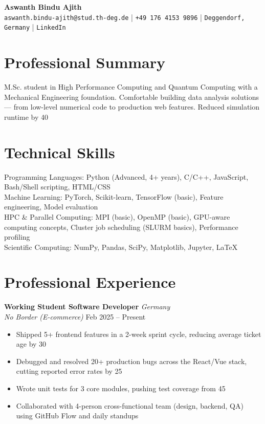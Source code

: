\documentclass[11pt,a4paper]{article}
\newcommand{\entryheader}[4]{%
    \textbf{#1} \hfill \textit{#2}\\
    \textit{#3} \hfill #4
}
\begin{document}
\begin{center}
    {\LARGE\bfseries Aswanth Bindu Ajith}\\[4pt]
    \texttt{aswanth.bindu-ajith@stud.th-deg.de} | \texttt{+49 176 4153 9896} | \texttt{Deggendorf, Germany} | \texttt{LinkedIn}
\end{center}

\section{Professional Summary}
M.Sc. student in High Performance Computing and Quantum Computing with a Mechanical Engineering foundation. Comfortable building data analysis solutions — from low-level numerical code to production web features. Reduced simulation runtime by 40%

\section{Technical Skills}

Programming Languages: Python (Advanced, 4+ years), C/C++, JavaScript, Bash/Shell scripting, HTML/CSS\\

Machine Learning: PyTorch, Scikit-learn, TensorFlow (basic), Feature engineering, Model evaluation\\

HPC & Parallel Computing: MPI (basic), OpenMP (basic), GPU-aware computing concepts, Cluster job scheduling (SLURM basics), Performance profiling\\

Scientific Computing: NumPy, Pandas, SciPy, Matplotlib, Jupyter, LaTeX


\section{Professional Experience}

\entryheader{ Working Student Software Developer }{ Germany }{ No Border (E-commerce) }{ Feb 2025 – Present }
\begin{itemize}[leftmargin=*,nosep,topsep=2pt]
    
    \item Shipped 5+ frontend features in a 2-week sprint cycle, reducing average ticket age by 30%
    
    \item Debugged and resolved 20+ production bugs across the React/Vue stack, cutting reported error rates by 25%
    
    \item Wrote unit tests for 3 core modules, pushing test coverage from 45%
    
    \item Collaborated with 4-person cross-functional team (design, backend, QA) using GitHub Flow and daily standups
    
\end{itemize}
\end{document}

